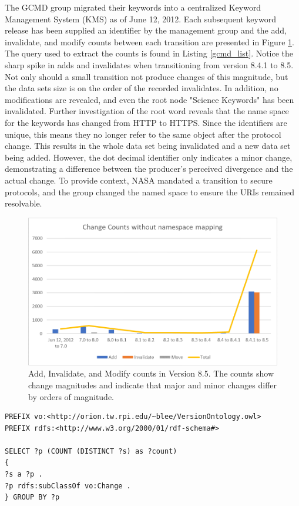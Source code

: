 The GCMD group migrated their keywords into a centralized Keyword Management System (KMS) as of June 12, 2012.
Each subsequent keyword release has been supplied an identifier by the management group and the add, invalidate, and modify counts between each transition are presented in Figure \ref{GCMDC1}.
The query used to extract the counts is found in Listing \ref{gcmd_list}.
Notice the sharp spike in adds and invalidates when transitioning from version 8.4.1 to 8.5.
Not only should a small transition not produce changes of this magnitude, but the data sets size is on the order of the recorded invalidates.
In addition, no modifications are revealed, and even the root node "Science Keywords" has been invalidated.
Further investigation of the root word reveals that the name space for the keywords has changed from HTTP to HTTPS.
Since the identifiers are unique, this means they no longer refer to the same object after the protocol change.
This results in the whole data set being invalidated and a new data set being added.
However, the dot decimal identifier only indicates a minor change, demonstrating a difference between the producer's perceived divergence and the actual change.
To provide context, NASA mandated a transition to secure protocols, and the group changed the named space to ensure the URIs remained resolvable.

\begin{figure}%
	\centering
	\includegraphics[scale=1]{figures/GCMDChart1.png}
	\caption{Add, Invalidate, and Modify counts in Version 8.5.  The counts show change magnitudes and indicate that major and minor changes differ by orders of magnitude.}
	\label{GCMDC1}
\end{figure}

\begin{lstlisting}[language=SPARQL, caption=This query compiles the counts for each subclass of Change in a GCMD versioning graph,label=gcmd_list]
PREFIX vo:<http://orion.tw.rpi.edu/~blee/VersionOntology.owl>
PREFIX rdfs:<http://www.w3.org/2000/01/rdf-schema#>

SELECT ?p (COUNT (DISTINCT ?s) as ?count)
{
?s a ?p .
?p rdfs:subClassOf vo:Change .
} GROUP BY ?p
\end{lstlisting}

